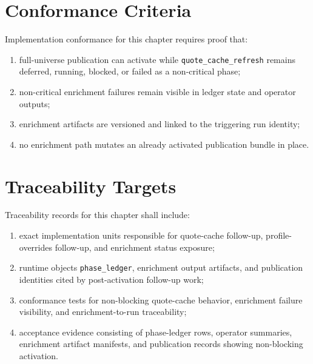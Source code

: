 \section{Conformance Criteria}
Implementation conformance for this chapter requires proof that:
\begin{enumerate}[leftmargin=1.2cm]
    \item full-universe publication can activate while \texttt{quote\_cache\_refresh} remains deferred, running, blocked, or failed as a non-critical phase;
    \item non-critical enrichment failures remain visible in ledger state and operator outputs;
    \item enrichment artifacts are versioned and linked to the triggering run identity;
    \item no enrichment path mutates an already activated publication bundle in place.
\end{enumerate}

\section{Traceability Targets}
Traceability records for this chapter shall include:
\begin{enumerate}[leftmargin=1.2cm]
    \item exact implementation units responsible for quote-cache follow-up, profile-overrides follow-up, and enrichment status exposure;
    \item runtime objects \texttt{phase\_ledger}, enrichment output artifacts, and publication identities cited by post-activation follow-up work;
    \item conformance tests for non-blocking quote-cache behavior, enrichment failure visibility, and enrichment-to-run traceability;
    \item acceptance evidence consisting of phase-ledger rows, operator summaries, enrichment artifact manifests, and publication records showing non-blocking activation.
\end{enumerate}
